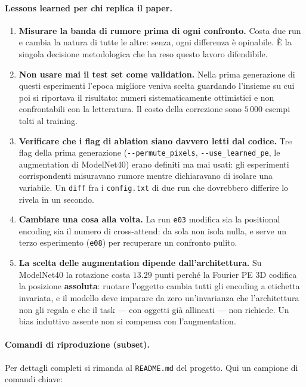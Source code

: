 \documentclass[
  11pt,
]{article}
\begin{document}
\paragraph{Lessons learned per chi replica il paper.}
\begin{enumerate}
\item \textbf{Misurare la banda di rumore prima di ogni confronto.} Costa due run e cambia la natura di tutte le altre: senza, ogni differenza è opinabile. È la singola decisione metodologica che ha reso questo lavoro difendibile.
\item \textbf{Non usare mai il test set come validation.} Nella prima generazione di questi esperimenti l'epoca migliore veniva scelta guardando l'insieme su cui poi si riportava il risultato: numeri sistematicamente ottimistici e non confrontabili con la letteratura. Il costo della correzione sono $5\,000$ esempi tolti al training.
\item \textbf{Verificare che i flag di ablation siano davvero letti dal codice.} Tre flag della prima generazione (\texttt{-{}-permute\_pixels}, \texttt{-{}-use\_learned\_pe}, le augmentation di ModelNet40) erano definiti ma mai usati: gli esperimenti corrispondenti misuravano rumore mentre dichiaravano di isolare una variabile. Un \texttt{diff} fra i \texttt{config.txt} di due run che dovrebbero differire lo rivela in un secondo.
\item \textbf{Cambiare una cosa alla volta.} La run \texttt{e03} modifica sia la positional encoding sia il numero di cross-attend: da sola non isola nulla, e serve un terzo esperimento (\texttt{e08}) per recuperare un confronto pulito.
\item \textbf{La scelta delle augmentation dipende dall'architettura.} Su ModelNet40 la rotazione costa $13.29$ punti perché la Fourier PE 3D codifica la posizione \textbf{assoluta}: ruotare l'oggetto cambia tutti gli encoding a etichetta invariata, e il modello deve imparare da zero un'invarianza che l'architettura non gli regala e che il task --- con oggetti già allineati --- non richiede. Un bias induttivo assente non si compensa con l'augmentation.
\end{enumerate}

\paragraph{Comandi di riproduzione (subset).} Per dettagli completi si rimanda al \texttt{README.md} del progetto. Qui un campione di comandi chiave:
\end{document}
